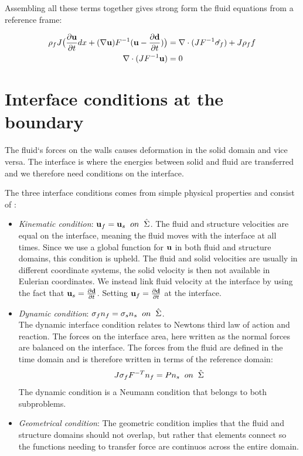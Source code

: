 Assembling all these terms together gives strong form the fluid equations from a reference frame:

\begin{align}
\label{eq:NS_mapped}
\rho_f J \big( \frac{\partial \bold{u}}{\partial t} dx + (\nabla \bold{u})F^{-1}(\bold{u}-\frac{\partial \bold{d}}{\partial t}) \big) &= \nabla \cdot( J F^{-1} \hat{\sigma_f} ) + J \rho_f f \\
\nabla \cdot (J F^{-1} \bold{u} ) &= 0
\end{align} 

\section{Interface conditions at the boundary}
The fluid`s forces on the walls causes deformation in the solid domain and vice versa. The interface is where the energies between solid and fluid are transferred and we therefore need conditions on the interface. \newline

The three interface conditions comes from simple physical properties and consist of \cite{Richter2010}:
\begin{itemize}
\item \textit{Kinematic condition}: $\bold{u}_f = \bold{u}_s  \hspace{2mm} on \hspace{2mm} \hat{\Sigma}$. The fluid and structure velocities are equal on the interface, meaning the fluid moves with the interface at all times. 
Since we use a global function for $\bold{u}$ in both fluid and structure domains, this condition is upheld.
The fluid and solid velocities are usually in different coordinate systems, the solid velocity is then not available in Eulerian coordinates. We instead link fluid velocity at the interface by using the fact that $\bold{u}_s = \frac{\partial \bold{d}}{\partial t}$. Setting $\bold{u}_f = \frac{\partial \bold{d}}{\partial t}$ at the interface.

\item \textit{Dynamic condition}: $  \sigma_f n_f = \sigma_s n_s \hspace{2mm} on  \hspace{2mm}\hat{\Sigma}   $. \\
	The dynamic interface condition relates to Newtons third law of action and reaction. The forces on the interface area, here written as the normal forces are balanced on the interface. The forces from the fluid are defined in the time domain and is therefore written in terms of the reference domain: 
	$$J\sigma_f F^{-T} n_f = P n_s \hspace{2mm} on  \hspace{2mm}\hat{\Sigma} $$
	The dynamic condition is a Neumann condition that belongs to both subproblems.
	
\item \textit{Geometrical condition}: The geometric condition implies that the fluid and structure domains should not overlap, but rather that elements connect so the functions needing to transfer force are continuos across the entire domain.
\end{itemize}

